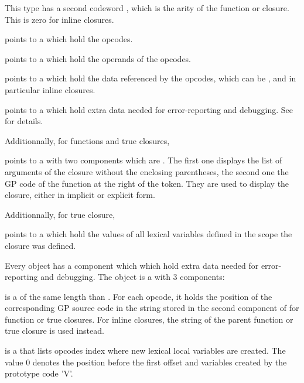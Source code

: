 This type has a second codeword , which is the arity of the
function or closure. This is zero for inline closures.

\item {} points to a  which hold the opcodes.

\item {} points to a  which hold the operands of the opcodes.

\item {} points to a  which hold the data referenced by the
 opcodes, which can be , and in particular
inline closures.

\item {} points to a  which hold extra data needed for
error-reporting and debugging. See  for details.

Additionnally, for functions and true closures,

\item {} points to a  with two components which are .
The first one displays the list of arguments of the closure without the
enclosing parentheses, the second one the GP code of the function at the
right of the \kbd{->} token. They are used to display the closure, either in
implicit or explicit form.

Additionnally, for true closure,

\item {} points to a  which hold the values of all lexical
variables defined in the scope the closure was defined.

\label{se:dbgclosure}

Every  object  has a component 
which which hold extra data needed for error-reporting and debugging.
The object  is a  with $3$ components:

 is a  of the same length than . For each
opcode, it holds the position of the corresponding GP source code in the string
stored in the second component of  for function or true closures.
For inline closures, the string of the parent function or true closure is used
instead.

 is a  that lists opcodes index where new lexical
local variables are created. The value $0$ denotes the position before the
first offset and variables created by the prototype code 'V'.

